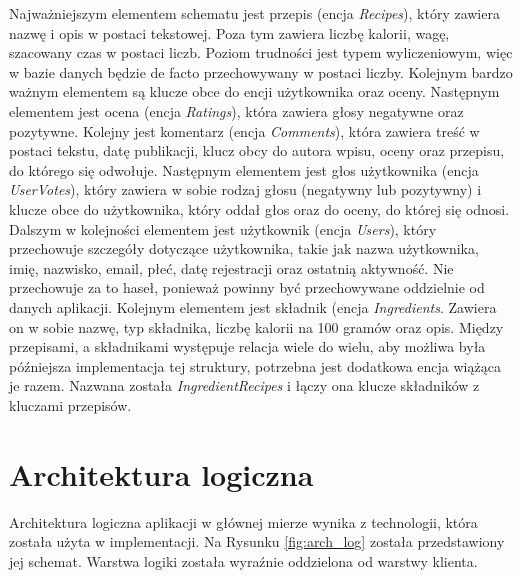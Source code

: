 Najważniejszym elementem schematu jest przepis (encja \textit{Recipes}), który zawiera nazwę i opis w postaci tekstowej. Poza tym zawiera liczbę kalorii, wagę, szacowany czas w postaci liczb. Poziom trudności jest typem wyliczeniowym, więc w bazie danych będzie de facto przechowywany w postaci liczby. Kolejnym bardzo ważnym elementem są klucze obce do encji użytkownika oraz oceny.\newline
Następnym elementem jest ocena (encja \textit{Ratings}), która zawiera głosy negatywne oraz pozytywne.\newline
Kolejny jest komentarz (encja \textit{Comments}), która zawiera treść w postaci tekstu, datę publikacji, klucz obcy do autora wpisu, oceny oraz przepisu, do którego się odwołuje.\newline
Następnym elementem jest głos użytkownika (encja \textit{UserVotes}), który zawiera w sobie rodzaj głosu (negatywny lub pozytywny) i klucze obce do użytkownika, który oddał głos oraz do oceny, do której się odnosi.\newline
Dalszym w kolejności elementem jest użytkownik (encja \textit{Users}), który przechowuje szczegóły dotyczące użytkownika, takie jak nazwa użytkownika, imię, nazwisko, email, płeć, datę rejestracji oraz ostatnią aktywność. Nie przechowuje za to haseł, ponieważ powinny być przechowywane oddzielnie od danych aplikacji.\newline
Kolejnym elementem jest składnik (encja \textit{Ingredients}. Zawiera on w sobie nazwę, typ składnika, liczbę kalorii na 100 gramów oraz opis.\newline
Między przepisami, a składnikami występuje relacja wiele do wielu, aby możliwa była późniejsza implementacja tej struktury, potrzebna jest dodatkowa encja wiążąca je razem. Nazwana została \textit{IngredientRecipes} i łączy ona klucze składników z kluczami przepisów.

\section{Architektura logiczna}
\label{chap:arch_log}
Architektura logiczna aplikacji w głównej mierze wynika z technologii, która została użyta w implementacji. Na Rysunku \ref{fig:arch_log} została przedstawiony jej schemat. Warstwa logiki została wyraźnie oddzielona od warstwy klienta.\newline

